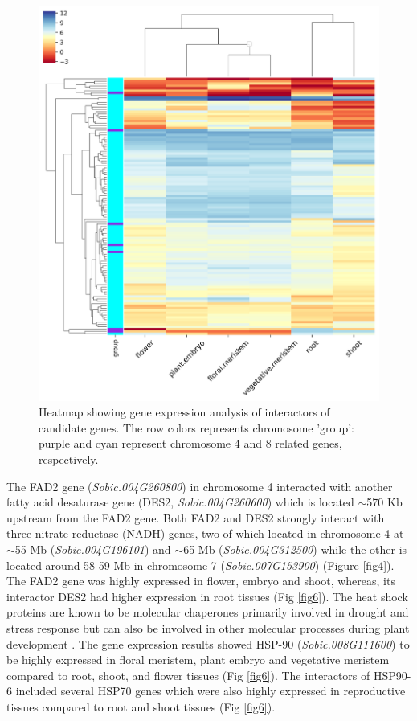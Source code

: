 \documentclass[10pt,letterpaper]{article}
\begin{document}
\begin{figure}
    \includegraphics[width=\textwidth]{Figure5}
    \caption{Heatmap showing gene expression analysis of interactors of candidate genes. The row colors represents chromosome 'group': purple and cyan represent chromosome 4 and 8 related genes, respectively.}
    \label{fig5}
\end{figure}

The FAD2 gene (\textit{Sobic.004G260800}) in chromosome 4 interacted with another fatty acid desaturase gene (DES2, \textit{Sobic.004G260600}) which is located $\sim$570 Kb upstream from the FAD2 gene. Both FAD2 and DES2 strongly interact with three nitrate reductase (NADH) genes, two of which located in chromosome 4 at $\sim$55 Mb (\textit{Sobic.004G196101}) and $\sim$65 Mb (\textit{Sobic.004G312500}) while the other is located around 58-59 Mb in chromosome 7 (\textit{Sobic.007G153900}) (Figure \ref{fig4}). The FAD2 gene was highly expressed in flower, embryo and shoot, whereas, its interactor DES2 had higher expression in root tissues (Fig \ref{fig6}). The heat shock proteins are known to be molecular chaperones primarily involved in drought and stress response but can also be involved in other molecular processes during plant development \parencite{yu1998polypeptides,khan2019heat}. The gene expression results showed HSP-90 (\textit{Sobic.008G111600}) to be highly expressed in floral meristem, plant embryo and vegetative meristem compared to root, shoot, and flower tissues (Fig \ref{fig6}). The interactors of HSP90-6 included several HSP70 genes which were also highly expressed in reproductive tissues compared to root and shoot tissues (Fig \ref{fig6}).
\end{document}
